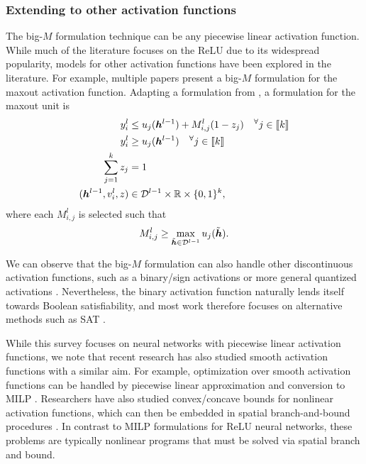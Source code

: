 \subsubsection{Extending to other activation functions}
The big-$M$ formulation technique can be any piecewise linear activation function. While much of the literature focuses on the ReLU due to its widespread popularity, models for other activation functions have been explored in the literature. For example, multiple papers \citep[Appendix K]{serra2018bounding} \citep[Appendix A.2]{tjeng2017evaluating} present a big-$M$ formulation for the maxout activation function. 
Adapting a formulation from \cite{anderson2020strong} \citep[Proposition 10]{anderson2020strong}, a formulation for the maxout unit is
\begin{alignat*}{2}
    y^l_i &\leq u_j({\bm{h}}^{l-1}) + M^l_{i,j}(1-z_j) \quad ^\forall j \in \llbracket k \rrbracket \\
    y^l_i &\geq u_j({\bm{h}}^{l-1}) \quad ^\forall j \in \llbracket k \rrbracket \\
    \sum_{j=1}^k z_j &= 1 \\
    ({\bm{h}}^{l-1},v^l_i,z) &\in \mathcal{D}^{l-1} \times \mathbb{R} \times \{0,1\}^k,
\end{alignat*}
where each $M^l_{i,j}$ is selected such that
\[
    M^l_{i,j} \geq \max_{\tilde{{\bm{h}}} \in \mathcal{D}^{l-1}} u_j(\tilde{{\bm{h}}}).
\]

We can observe that the big-$M$ formulation can also handle other discontinuous activation functions, such as a binary/sign activations \citep{han2021single} or more general quantized activations \citep{nguyen2022}. 
Nevertheless, the binary activation function naturally lends itself towards Boolean satisfiability, and most work therefore focuses on alternative methods such as SAT \citep{cheng2018verification,jia2020efficient,narodytska2018verifying}. 

While this survey focuses on neural networks with piecewise linear activation functions, we note that recent research has also studied smooth activation functions with a similar aim. 
For example, optimization over smooth activation functions can be handled by piecewise linear approximation and conversion to MILP \citep{sildir2022mixed}. 
Researchers have also studied convex/concave bounds for nonlinear activation functions, which can then be embedded in spatial branch-and-bound procedures \citep{schweidtmann2019deterministic,wilhelm2022convex}.
In contrast to MILP formulations for ReLU neural networks, these problems are typically nonlinear programs that must be solved via spatial branch and bound.

